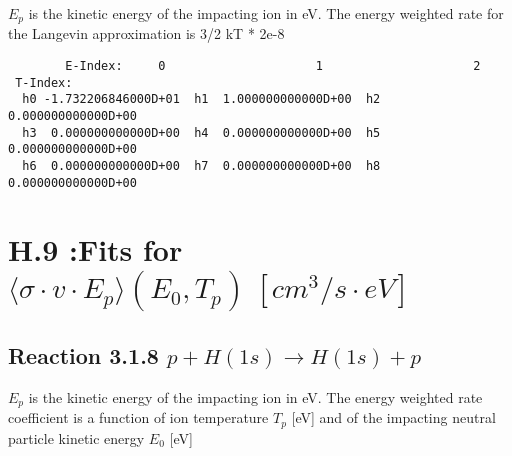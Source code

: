 \documentclass[12pt,dvipdfmx]{article}
\begin{document}
$E_p$ is the kinetic energy of the impacting ion in eV.
The energy weighted rate for the Langevin approximation is
3/2 kT * 2e-8

\begin{small}\begin{verbatim}
        E-Index:     0                     1                     2
 T-Index:
  h0 -1.732206846000D+01  h1  1.000000000000D+00  h2  0.000000000000D+00
  h3  0.000000000000D+00  h4  0.000000000000D+00  h5  0.000000000000D+00
  h6  0.000000000000D+00  h7  0.000000000000D+00  h8  0.000000000000D+00

\end{verbatim}\end{small}

\section{H.9 :Fits for $\langle\sigma \cdot v \cdot E_p \rangle (E_0,T_p) \ [cm^3/s
\cdot eV]$}

\subsection{
Reaction 3.1.8   $p + H(1s)  \rightarrow  H(1s) + p $
}
$E_p$ is the kinetic energy of the impacting ion in eV.
The energy weighted rate coefficient is a function of ion temperature $T_p$
[eV]  and of the impacting neutral particle kinetic energy $E_0$ [eV]
\end{document}
